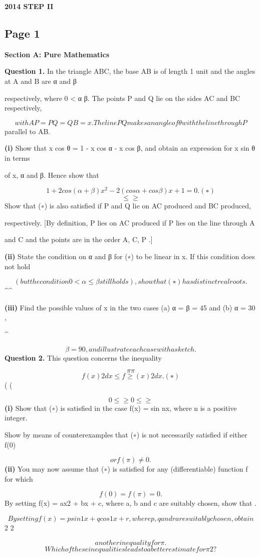 \documentclass[12pt]{article}
\begin{document}
\begin{center}
{\Large \textbf{2014 STEP II}}
\end{center}

\subsection*{Page 1}
\begin{flushleft}
\bigskip\textbf{Section A: Pure Mathematics}\par
\bigskip\textbf{Question 1.} In the triangle ABC, the base AB is of length 1 unit and the angles at A and B are α and β\par
respectively, where 0 < α \leq β. The points P and Q lie on the sides AC and BC respectively,\par
\[with AP = P Q = QB = x. The line P Q makes an angle of θ with the line through P\]
parallel to AB.\par
\textbf{(i)} Show that x cos θ = 1 - x cos α - x cos β, and obtain an expression for x sin θ in terms\par
of x, α and β. Hence show that\par
\[1 + 2 cos(α + β) x^2 - 2(cos α + cos β)x + 1 = 0 . (∗)\]
\[\leq \geq\]
Show that (∗) is also satisfied if P and Q lie on AC produced and BC produced,\par
respectively. [By definition, P lies on AC produced if P lies on the line through A\par
and C and the points are in the order A, C, P .]\par
\textbf{(ii)} State the condition on α and β for (∗) to be linear in x. If this condition does not hold\par
\[(but the condition 0 < α \leq β still holds), show that (∗) has distinct real roots.\]
\textasciicircum{}\circ \textasciicircum{}\circ\par
\textbf{(iii)} Find the possible values of x in the two cases (a) α = β = 45 and (b) α = 30 ,\par
\textasciicircum{}\circ\par
\[β = 90 , and illustrate each case with a sketch.\]
\bigskip\textbf{Question 2.} This question concerns the inequality\par
\[\pi \pi\]
\[f(x) 2 dx \leq f \geq (x) 2 dx . (∗)\]
( (\par
\[0 \leq \geq 0 \leq \geq\]
\textbf{(i)} Show that (∗) is satisfied in the case f(x) = sin nx, where n is a positive integer.\par
Show by means of counterexamples that (∗) is not necessarily satisfied if either f(0) \par
\[or f(\pi) \ne 0.\]
\textbf{(ii)} You may now assume that (∗) is satisfied for any (differentiable) function f for which\par
\[f(0) = f(\pi) = 0.\]
By setting f(x) = ax2 + bx + c, where a, b and c are suitably chosen, show that  .\par
\[By setting f(x) = p sin 1 x + q cos 1 x + r, where p, q and r are suitably chosen, obtain\]
2 2\par
\[another inequality for \pi.\]
\[Which of these inequalities leads to a better estimate for \pi2 ?\]
\end{flushleft}
\end{document}
